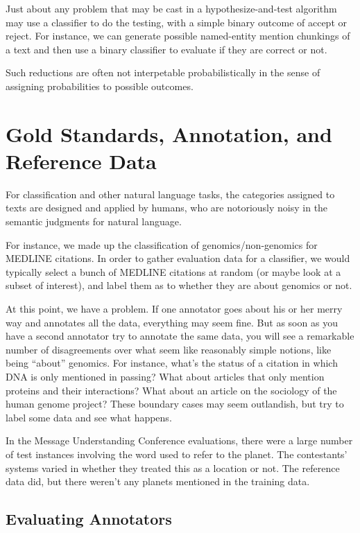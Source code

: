 Just about any problem that may be cast in a hypothesize-and-test
algorithm may use a classifier to do the testing, with a simple binary
outcome of accept or reject.  For instance, we can generate possible
named-entity mention chunkings of a text and then use a binary
classifier to evaluate if they are correct or not.  

Such reductions are often not interpetable probabilistically in the
sense of assigning probabilities to possible outcomes.



\section{Gold Standards, Annotation, and Reference Data}

For classification and other natural language tasks, the categories
assigned to texts are designed and applied by humans, who are
notoriously noisy in the semantic judgments for natural language.  

For instance, we made up the classification of genomics/non-genomics
for MEDLINE citations.  In order to gather evaluation data for a
classifier, we would typically select a bunch of MEDLINE citations at
random (or maybe look at a subset of interest), and label them
as to whether they are about genomics or not.

At this point, we have a problem.  If one annotator goes about his or
her merry way and annotates all the data, everything may seem fine.
But as soon as you have a second annotator try to annotate the same
data, you will see a remarkable number of disagreements over what seem
like reasonably simple notions, like being ``about'' genomics.  For
instance, what's the status of a citation in which DNA is only
mentioned in passing?  What about articles that only mention proteins
and their interactions?  What about an article on the sociology of the
human genome project?  These boundary cases may seem outlandish, but
try to label some data and see what happens.

In the Message Understanding Conference evaluations, there were a
large number of test instances involving the word 
used to refer to the planet.  The contestants' systems varied in
whether they treated this as a location or not.  The reference data
did, but there weren't any planets mentioned in the training data.

\subsection{Evaluating Annotators}

